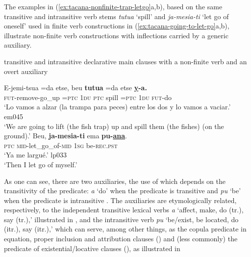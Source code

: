 \documentclass[output=paper]{langsci/langscibook}
\begin{document}
The examples in (\ref{ex:tacana-nonfinite-trap-letgo}a,b), based on the
same transitive and intransitive verb stems \textit{tutua} `spill' and
\textit{ja-mesia-ti} `let go of oneself' used in finite verb constructions
in (\ref{ex:tacana-going-to-let-go}a,b), illustrate non-finite verb
constructions with inflections carried by a generic auxiliary.
%
\begin{exe}\ex \label{ex:tacana-nonfinite-trap-letgo}  transitive and
intransitive declarative main clauses with a non-finite verb and an overt
auxiliary 
\begin{xlist}
\ex\label{ex:tacana-nonfinite-trap}
\gll   E-jemi-tsua   =da  etse,  beu
\textbf{tutua} =da
etse \textbf{\underline{y}-a.}\\
    \textsc{fut}-remove-go\_up  \textsc{=ptc}  \textsc{1du} 
    \textsc{ptc}  spill  =\textsc{ptc}  \textsc{1du}  \textsc{fut-}do\\
\glt `Lo vamos a alzar (la trampa para peces) entre los dos y
lo vamos a vaciar.' em045\\
`We are going to lift (the fish trap) up and spill them (the fishes)
(on the ground).'
\ex\label{ex:tacana-nonfinite-letgo}
\gll  Beu,
\textbf{ja-mesia-ti}
ema \textbf{pu-\underline{ana}}.\\
    \textsc{ptc}  \textsc{mid-}let\_go\_of-\textsc{mid}  \textsc{1sg}
    be\textsc{-rec.pst}\\
\glt `Ya me largué.' lp033\\
`Then I let go of myself.'
\end{xlist}\end{exe}
%
As one can see, there are two auxiliaries, the use of which depends on the
transitivity of the predicate: \textit{a} `do' when the predicate is
transitive  and \textit{pu} `be' when the
predicate is intransitive . The auxiliaries
are etymologically related, respectively, to the independent transitive
lexical verbs \textit{a} `affect, make, do (tr.), say (tr.),' illustrated
in , and the intransitive verb
\textit{pu} `be\slash exist, be located, do (itr.), say (itr.),' which can
serve, among other things, as the copula predicate in equation, proper
inclusion and attribution clauses () and (less
commonly) the predicate of existential\slash locative clauses
(), as illustrated in
\end{document}
